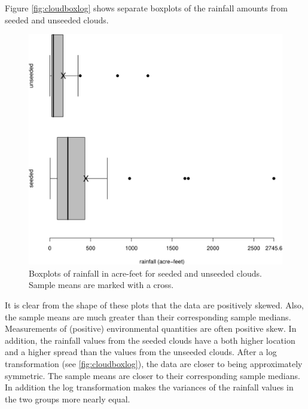 \documentclass[
  11pt,
  british,
  openany, a4paper]{book}
\begin{document}
Figure \ref{fig:cloudboxlog} shows separate boxplots of the rainfall amounts from seeded and unseeded clouds.

\begin{figure}

{\centering \includegraphics[width=0.75\linewidth]{images/cloud_box} 

}

\caption{Boxplots of rainfall in acre-feet for seeded and unseeded clouds.  Sample means are marked with a cross.}\label{fig:cloudbox}
\end{figure}

It is clear from the shape of these plots that the data are positively skewed. Also, the sample means are much greater than their corresponding sample medians. Measurements of (positive) environmental quantities are often positive skew. In addition, the rainfall values from the seeded clouds have a both higher location and a higher spread than the values from the unseeded clouds. After a log transformation (see \ref{fig:cloudboxlog}), the data are closer to being approximately symmetric. The sample means are closer to their corresponding sample medians. In addition the log transformation makes the variances of the rainfall values in the two groups more nearly equal.
\end{document}
